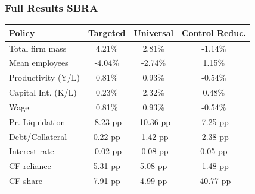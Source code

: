 \documentclass[aspectratio=169,xcolor=table]{beamer}
\begin{document}
\begin{frame}[label=sbra_fullres] \frametitle{Full Results SBRA \hfill \hyperlink{sbra_effect}{}}

\begin{table}[H]
    \centering
    \renewcommand{\arraystretch}{0.95}
    \begin{tabular}{lccc}
    \textbf{Policy} & \textbf{Targeted} & \textbf{Universal} & \textbf{Control Reduc.} \\    
    \toprule
    Total firm mass & 4.21\%  & 2.81\% & -1.14\%  \\  
    Mean employees & -4.04\%  & -2.74\% & 1.15\%   \\  
    Productivity (Y/L) & 0.81\%  & 0.93\% & -0.54\%  \\  
    Capital Int. (K/L) & 0.23\%  & 2.32\% & 0.48\%  \\  
    Wage & 0.81\%  & 0.93\% & -0.54\%  \vspace{2mm}  \\  
    Pr. Liquidation & -8.23 pp  & -10.36 pp & -7.25 pp \\  
    Debt/Collateral & 0.22 pp  & -1.42 pp & -2.38 pp  \\  
    Interest rate & -0.02 pp  & -0.08 pp & 0.05 pp  \\  
    CF reliance & 5.31 pp  & 5.08 pp & -1.48 pp  \\    
    CF share & 7.91 pp  & 4.99 pp & -40.77 pp  \\  
    \bottomrule
    \end{tabular}
    \label{tab:percentage_changes2}
\end{table}


\end{frame}
\end{document}
